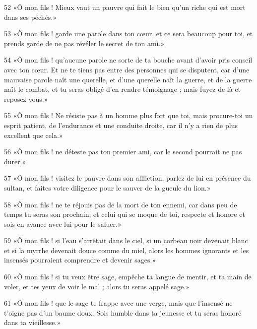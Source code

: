 \par 52 «Ô mon fils ! Mieux vaut un pauvre qui fait le bien qu'un riche qui est mort dans ses péchés.»

\par 53 «Ô mon fils ! garde une parole dans ton cœur, et ce sera beaucoup pour toi, et prends garde de ne pas révéler le secret de ton ami.»

\par 54 «Ô mon fils ! qu'aucune parole ne sorte de ta bouche avant d'avoir pris conseil avec ton cœur. Et ne te tiens pas entre des personnes qui se disputent, car d'une mauvaise parole naît une querelle, et d'une querelle naît la guerre, et de la guerre naît le combat, et tu seras obligé d'en rendre témoignage ; mais fuyez de là et reposez-vous.»

\par 55 «Ô mon fils ! Ne résiste pas à un homme plus fort que toi, mais procure-toi un esprit patient, de l'endurance et une conduite droite, car il n'y a rien de plus excellent que cela.»

\par 56 «Ô mon fils ! ne déteste pas ton premier ami, car le second pourrait ne pas durer.»

\par 57 «Ô mon fils ! visitez le pauvre dans son affliction, parlez de lui en présence du sultan, et faites votre diligence pour le sauver de la gueule du lion.»

\par 58 «Ô mon fils ! ne te réjouis pas de la mort de ton ennemi, car dans peu de temps tu seras son prochain, et celui qui se moque de toi, respecte et honore et sois en avance avec lui pour le saluer.»

\par 59 «Ô mon fils ! si l'eau s'arrêtait dans le ciel, si un corbeau noir devenait blanc et si la myrrhe devenait douce comme du miel, alors les hommes ignorants et les insensés pourraient comprendre et devenir sages.»

\par 60 «Ô mon fils ! si tu veux être sage, empêche ta langue de mentir, et ta main de voler, et tes yeux de voir le mal ; alors tu seras appelé sage.»

\par 61 «Ô mon fils ! que le sage te frappe avec une verge, mais que l'insensé ne t'oigne pas d'un baume doux. Sois humble dans ta jeunesse et tu seras honoré dans ta vieillesse.»


